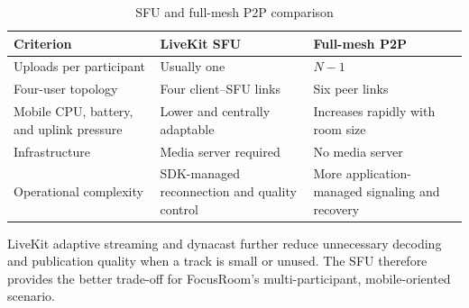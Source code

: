 \begin{table}[H]
\centering
\begin{tabularx}{\textwidth}{|X|p{}|p{}|}
\hline
\textbf{Criterion} & \textbf{LiveKit SFU} & \textbf{Full-mesh P2P} \\ \hline
Uploads per participant & Usually one & $N-1$ \\ \hline
Four-user topology & Four client--SFU links & Six peer links \\ \hline
Mobile CPU, battery, and uplink pressure & Lower and centrally adaptable & Increases rapidly with room size \\ \hline
Infrastructure & Media server required & No media server \\ \hline
Operational complexity & SDK-managed reconnection and quality control & More application-managed signaling and recovery \\ \hline
\end{tabularx}
\caption{SFU and full-mesh P2P comparison}
\label{tab:sfu_comparison}
\end{table}

LiveKit adaptive streaming and dynacast further reduce unnecessary decoding and publication quality when a track is small or unused. The SFU therefore provides the better trade-off for FocusRoom's multi-participant, mobile-oriented scenario.
